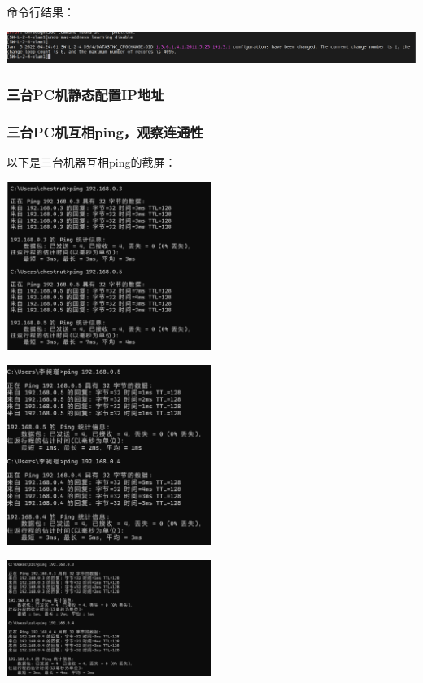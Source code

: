 \documentclass{article}
\begin{document}
命令行结果：

\vspace{10pt}
\centerline{\includegraphics[width=1\textwidth]{2_4_images/1.png}}
\vspace{10pt}

\subsubsection{三台PC机静态配置IP地址}

\subsubsection{三台PC机互相ping，观察连通性}
以下是三台机器互相ping的截屏：

\vspace{10pt}
\centerline{\includegraphics[width=0.5\textwidth]{2_4_images/2.png}}
\vspace{10pt}

\vspace{10pt}
\centerline{\includegraphics[width=0.5\textwidth]{2_4_images/3.png}}
\vspace{10pt}

\vspace{10pt}
\centerline{\includegraphics[width=0.5\textwidth]{2_4_images/4.png}}
\vspace{10pt}
\end{document}
